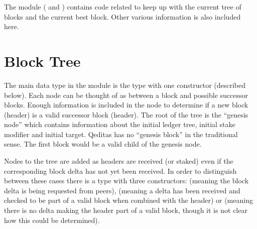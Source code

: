 The module {} ({} and {})
contains code related to keep up with the current tree of blocks
and the current best block.
Other various information is also included here.

\section{Block Tree}

The main data type in the module {} is the type {}
with one constructor {} (described below).
Each node can be thought of as between a block and possible successor blocks.
Enough information is included in the node to determine if a new block (header) is a valid successor block (header).
The root of the tree is the ``genesis node'' which contains information about
the initial ledger tree, initial stake modifier and initial target.
Qeditas has no ``genesis block'' in the traditional sense. The first block would be
a valid child of the genesis node.

Nodes to the tree are added as headers are received (or staked) even if the corresponding block delta
has not yet been received.
In order to distinguish between these cases there is a type {}
with three constructors: {} (meaning the block delta is being requested from peers),
{} (meaning a delta has been received and checked to be part of a valid block when
combined with the header)
or {} (meaning there is no delta making the header part of a valid block, though it is not clear how this could be determined).

